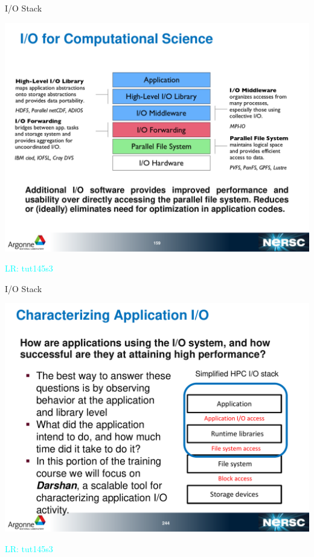 \documentclass[compress,11pt,xcolor=svgnames,aspectratio=169]{beamer}
\newcommand{\lr}[1]{\textcolor{cyan}{LR: #1}}
\begin{document}
\begin{frame}[t]{I/O Stack}

\begin{center}
\includegraphics[scale=0.4]{fig/io-stack2}
\end{center}

\lr{tut145s3}

\end{frame}

\begin{frame}[t]{I/O Stack}

\begin{center}
\includegraphics[scale=0.3]{fig/io-stack3}
\end{center}

\lr{tut145s3}

\end{frame}
\end{document}

